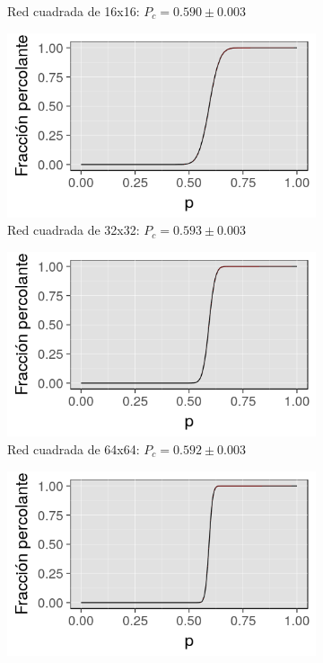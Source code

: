 \documentclass[%
 reprint,
 amsmath,amssymb,
 aps,
spanish]{revtex4-1}
\begin{document}
\begin{figure}[h]
\begin{subfigure}{.25\textwidth}
  \caption{Red cuadrada de 16x16: $P_c=0.590\pm0.003$}  
  \label{fig:1b16x16}
\end{subfigure}%
\begin{subfigure}{.25\textwidth}
  \centering
  \includegraphics[width=.9\linewidth]{ej1b/32x32}
  \caption{Red cuadrada de 32x32: $P_c=0.593\pm0.003$}  
  \label{fig:1b32x32}
\end{subfigure}
\begin{subfigure}{.25\textwidth}
  \centering
  \includegraphics[width=.9\linewidth]{ej1b/64x64}
  \caption{Red cuadrada de 64x64: $P_c=0.592\pm0.003$}  
  \label{fig:1b64x64}
\end{subfigure}%
\begin{subfigure}{.25\textwidth}
  \centering
  \includegraphics[width=.9\linewidth]{ej1b/128x128}

\end{subfigure}
\end{figure}
\end{document}
